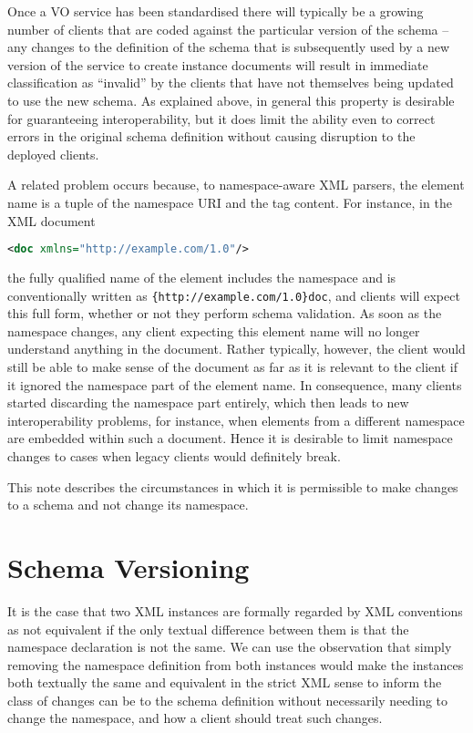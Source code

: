 \documentclass[10pt,a4paper]{ivoa}
\begin{document}
Once a VO service has been standardised there will typically be a growing number
of clients that are coded against the particular version of the
schema -- any changes to the definition of the schema that is subsequently used
by a new version of the service to create instance documents will result in
immediate classification as ``invalid'' by the clients that have not themselves being
updated to use the new schema.
As explained above, in general this property is desirable for guaranteeing interoperability, but it does limit
the ability even to correct errors in the original schema definition without
causing disruption to the deployed clients.

A related problem occurs because, to namespace-aware XML parsers, the
element name is a tuple of the namespace URI and the tag content.  For
instance, in the XML document

\begin{lstlisting}[language=XML]
<doc xmlns="http://example.com/1.0"/>
\end{lstlisting}
the fully qualified name of the element includes the namespace and is
conventionally written as \verb|{http://example.com/1.0}doc|, and clients will expect this full
form, whether or not they perform schema validation.  As soon as the
namespace changes, any client expecting this element name will no longer
understand anything in the document.  Rather typically, however, the
client would still be able to make sense of the document as far as it is
relevant to the client if it ignored the namespace part of the element
name.  In consequence, many clients started discarding the namespace
part entirely, which then leads to new interoperability problems, for
instance, when elements from a different namespace are embedded within
such a document.  Hence it is desirable to limit namespace changes to
cases when legacy clients would definitely break.

This note describes the
circumstances in which it is permissible to make changes to a schema and not
change its namespace.


\section{Schema Versioning}
It is the case that two XML instances are formally regarded by XML
conventions as not equivalent if the only textual difference between them is
that the namespace declaration is not the same. We
can use the observation that simply removing the namespace definition from both instances
would make the instances both textually the same and equivalent in the strict
XML sense to inform the class of changes can be to the schema definition without
necessarily needing to change the namespace, and how a client should treat such
changes.
\end{document}
